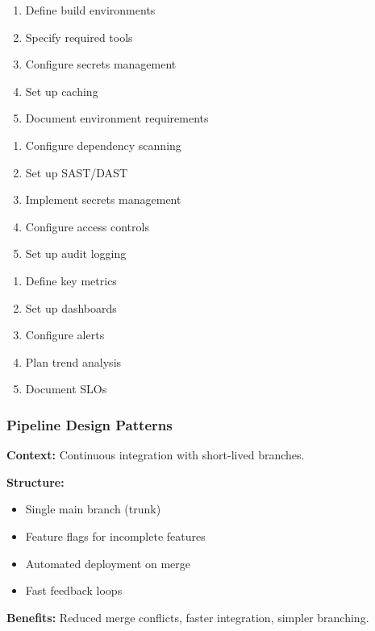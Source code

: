 \documentclass[11pt,letterpaper]{article}
\begin{document}
\begin{guidancebox}
\begin{enumerate}[nosep]
    \item Define build environments
    \item Specify required tools
    \item Configure secrets management
    \item Set up caching
    \item Document environment requirements
\end{enumerate}
\end{guidancebox}

\begin{guidancebox}
\begin{enumerate}[nosep]
    \item Configure dependency scanning
    \item Set up SAST/DAST
    \item Implement secrets management
    \item Configure access controls
    \item Set up audit logging
\end{enumerate}
\end{guidancebox}

\begin{guidancebox}
\begin{enumerate}[nosep]
    \item Define key metrics
    \item Set up dashboards
    \item Configure alerts
    \item Plan trend analysis
    \item Document SLOs
\end{enumerate}
\end{guidancebox}

\subsubsection{Pipeline Design Patterns}

\begin{patternbox}
\textbf{Context:} Continuous integration with short-lived branches.

\textbf{Structure:}
\begin{itemize}[nosep]
    \item Single main branch (trunk)
    \item Feature flags for incomplete features
    \item Automated deployment on merge
    \item Fast feedback loops
\end{itemize}

\textbf{Benefits:} Reduced merge conflicts, faster integration, simpler branching.
\end{patternbox}
\end{document}
